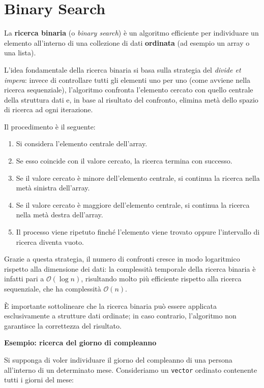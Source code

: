 
\chapter{Binary Search}


La \textbf{ricerca binaria} (o \emph{binary search}) è un algoritmo efficiente per individuare un elemento all'interno di una collezione di dati \textbf{ordinata} (ad esempio un array o una lista).

L'idea fondamentale della ricerca binaria si basa sulla strategia del \emph{divide et impera}: invece di controllare tutti gli elementi uno per uno (come avviene nella ricerca sequenziale), l'algoritmo confronta l'elemento cercato con quello centrale della struttura dati e, in base al risultato del confronto, elimina metà dello spazio di ricerca ad ogni iterazione.

Il procedimento è il seguente:
\begin{enumerate}
	\item Si considera l'elemento centrale dell'array.
	\item Se esso coincide con il valore cercato, la ricerca termina con successo.
	\item Se il valore cercato è minore dell'elemento centrale, si continua la ricerca nella metà sinistra dell'array.
	\item Se il valore cercato è maggiore dell'elemento centrale, si continua la ricerca nella metà destra dell'array.
	\item Il processo viene ripetuto finché l'elemento viene trovato oppure l'intervallo di ricerca diventa vuoto.
\end{enumerate}

Grazie a questa strategia, il numero di confronti cresce in modo logaritmico rispetto alla dimensione dei dati: la complessità temporale della ricerca binaria è infatti pari a \(\mathcal{O}(\log n)\), risultando molto più efficiente rispetto alla ricerca sequenziale, che ha complessità \(\mathcal{O}(n)\).

È importante sottolineare che la ricerca binaria può essere applicata esclusivamente a strutture dati ordinate; in caso contrario, l'algoritmo non garantisce la correttezza del risultato.

\bigskip 
\noindent\textbf{Esempio: ricerca del giorno di compleanno}

Si supponga di voler individuare il giorno del compleanno di una persona all’interno di un determinato mese.
Consideriamo un \texttt{vector} ordinato contenente tutti i giorni del mese:

